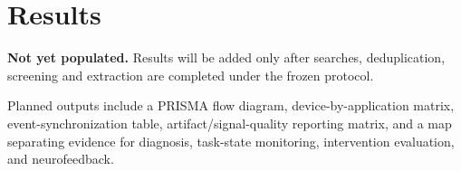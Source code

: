 \section{Results}

\textbf{Not yet populated.} Results will be added only after searches, deduplication, screening and extraction are completed under the frozen protocol.

Planned outputs include a PRISMA flow diagram, device-by-application matrix, event-synchronization table, artifact/signal-quality reporting matrix, and a map separating evidence for diagnosis, task-state monitoring, intervention evaluation, and neurofeedback.
